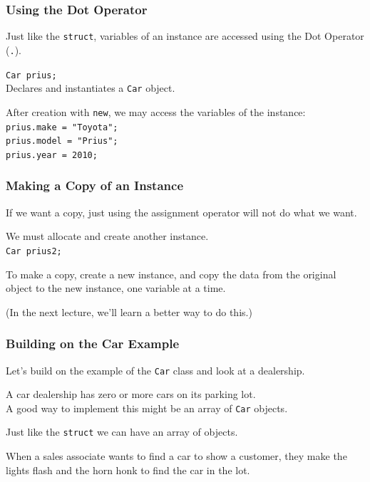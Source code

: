 \begin{frame}
\frametitle{Using the Dot Operator}

Just like the \texttt{struct}, variables of an instance are accessed using the Dot Operator (\texttt{.}).

\texttt{Car prius;}\\
\quad Declares and instantiates a \texttt{Car} object.

After creation with \texttt{new}, we may access the variables of the instance:\\
\quad \texttt{prius.make  = "Toyota";}\\
\quad \texttt{prius.model = "Prius";}\\
\quad \texttt{prius.year  = 2010;}

\end{frame}



\begin{frame}
\frametitle{Making a Copy of an Instance}

If we want a copy, just using the assignment operator will not do what we want.

We must allocate and create another instance.\\
\quad \texttt{Car prius2;}

To make a copy, create a new instance, and copy the data from the original object to the new instance, one variable at a time.

(In the next lecture, we'll learn a better way to do this.)

\end{frame}

\begin{frame}
\frametitle{Building on the Car Example}

Let's build on the example of the \texttt{Car} class and look at a dealership.

A car dealership has zero or more cars on its parking lot.\\
\quad A good way to implement this might be an array of \texttt{Car} objects.

Just like the \texttt{struct} we can have an array of objects.

When a sales associate wants to find a car to show a customer, they make the lights flash and the horn honk to find the car in the lot.

\end{frame}

